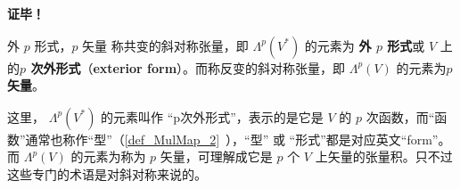 \textbf{证毕！}

\begin{definition}{外 $p$ 形式，$p$ 矢量}\label{def_SIofTe_2}
称共变的斜对称张量，即 $\Lambda^p(V^*)$ 的元素为 \textbf{外 $p$ 形式}或 $V$ 上的\textbf{$p$ 次外形式}（\textbf{exterior form}）。而称反变的斜对称张量，即 $\Lambda^p(V)$ 的元素为\textbf{$p$矢量}。
\end{definition}

这里， $\Lambda^p(V^*)$ 的元素叫作 “p次外形式”，表示的是它是 $V$ 的 $p$ 次函数，而“函数”通常也称作“型”（\autoref{def_MulMap_2}~），“型” 或 “形式”都是对应英文“form”。而 $\Lambda^p(V)$ 的元素为称为 $p$ 矢量，可理解成它是 $p$ 个 $V$ 上矢量的张量积。只不过这些专门的术语是对斜对称来说的。

